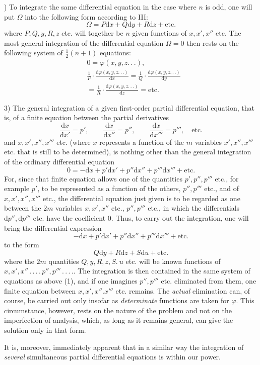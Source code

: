 ) To integrate the same differential equation in the case where $n$ is odd, one will put $\Omega$ into the following form according to III:
\[
\Omega=P\mathrm{d}x+Q\mathrm{d}y+R\mathrm{d}z+\mathrm{etc.}
\]
where $P,Q,y,R,z$ etc. will together be $n$ given functions of $x,x',x''$ etc. The most general integration of the differential equation $\Omega=0$ then rests on the following system of $\frac12(n+1)$ equations:
\[
\begin{aligned}&0=\varphi(x,y,z.\,.\,.),\\&
\frac1P\cdot\frac{\mathrm{d}\varphi(x,y,z.\,.\,.)}{\mathrm{d}x}
=\frac1Q\cdot\frac{\mathrm{d}\varphi(x,y,z.\,.\,.)}{\mathrm{d}y}
\\&=\frac1R\cdot\frac{\mathrm{d}\varphi(x,y,z.\,.\,.)}{\mathrm{d}z}=\mathrm{etc.}\end{aligned}
\]
\par{}
3) The general integration of a given first-order partial differential equation, that is, of a finite equation between the partial derivatives
\[
\frac{\mathrm{d}x}{\mathrm{d}x'}=p',\qquad
\frac{\mathrm{d}x}{\mathrm{d}x''}=p'',\qquad
\frac{\mathrm{d}x}{\mathrm{d}x'''}=p''',\quad\text{etc.}
\]
and $x,x',x'',x'''$ etc. (where $x$ represents a function of the $m$ variables $x',x'',x'''$ etc. that is still to be determined), is nothing other than the general integration of the ordinary differential equation
\[
0=-\mathrm{d}x+p'\mathrm{d}x'+p''\mathrm{d}x''+p'''\mathrm{d}x'''+\text{etc.}
\]
For, since that finite equation allows one of the quantities $p',p'',p'''$ etc., for example $p'$, to be represented as a function of the others, $p'',p'''$ etc., and of $x,x',x'',x'''$ etc., the differential equation just given is to be regarded as one between the $2m$ variables $x,x',x''$ etc., $p'',p'''$ etc., in which the differentials $\mathrm{d}p'',\mathrm{d}p'''$ etc. have the coefficient $0$. Thus, to carry out the integration, one will bring the differential expression
\[
-\mathrm{d}x+p'\mathrm{d}x'+p''\mathrm{d}x''+p'''\mathrm{d}x'''+\text{etc.}
\]
to the form
\[
Q\mathrm{d}y+R\mathrm{d}z+S\mathrm{d}u+\text{etc.}
\]
where the $2m$ quantities $Q,y,R,z,S.\ u$ etc. will be known functions of $x,x',x''\, .\, .\, .\, .\, p'',p'''\, .\, .\, .\, .$. The integration is then contained in the same system of equations as above (1), and if one imagines $p'',p'''$ etc. eliminated from them, one finite equation between $x,x',x''.x'''$ etc. remains. The \emph{actual} elimination can, of course, be carried out only insofar as \emph{determinate} functions are taken for $\varphi$. This circumstance, however, rests on the nature of the problem and not on the imperfection of analysis, which, as long as it remains general, can give the solution only in that form.

It is, moreover, immediately apparent that in a similar way the integration of \emph{several} simultaneous partial differential equations is within our power.



